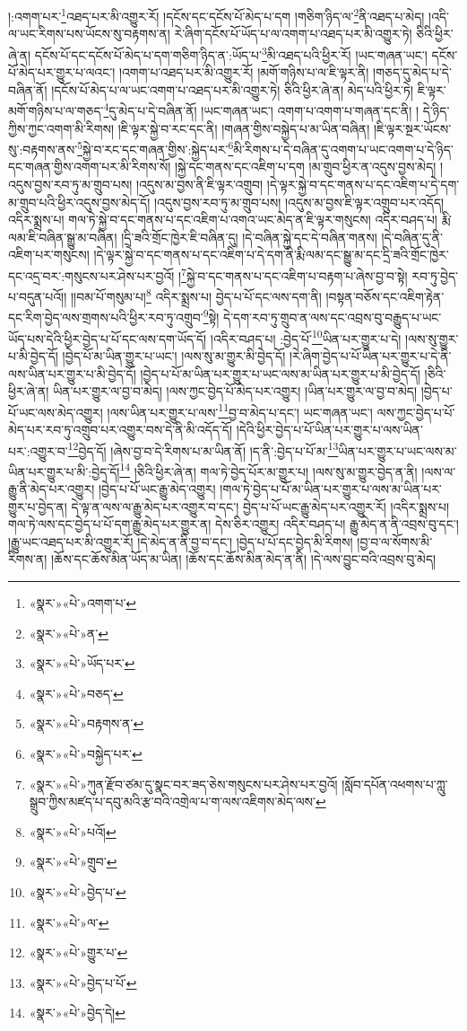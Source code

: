 །:འགག་པར་\footnote{«སྣར་»«པེ་»འགག་པ་}འཐད་པར་མི་འགྱུར་རོ། །དངོས་དང་དངོས་པོ་མེད་པ་དག །གཅིག་ཉིད་ལ་\footnote{«སྣར་»«པེ་»ན་}ནི་འཐད་པ་མེད། །འདི་ལ་ཡང་རིགས་པས་ཡོངས་སུ་བརྟགས་ན། རེ་ཞིག་དངོས་པོ་ཡོད་པ་ལ་འགག་པ་འཐད་པར་མི་འགྱུར་ཏེ། ཅིའི་ཕྱིར་ཞེ་ན། དངོས་པོ་དང་དངོས་པོ་མེད་པ་དག་གཅིག་ཉིད་ན་:ཡོད་པ་\footnote{«སྣར་»«པེ་»ཡོད་པར་}མི་འཐད་པའི་ཕྱིར་རོ། །ཡང་གཞན་ཡང་། དངོས་པོ་མེད་པར་གྱུར་པ་ལའང་། །འགག་པ་འཐད་པར་མི་འགྱུར་རོ། །མགོ་གཉིས་པ་ལ་ཇི་ལྟར་ནི། །གཅད་དུ་མེད་པ་དེ་བཞིན་ནོ། །དངོས་པོ་མེད་པ་ལ་ཡང་འགག་པ་འཐད་པར་མི་འགྱུར་ཏེ། ཅིའི་ཕྱིར་ཞེ་ན། མེད་པའི་ཕྱིར་ཏེ། ཇི་ལྟར་མགོ་གཉིས་པ་ལ་གཅད་\footnote{«སྣར་»«པེ་»བཅད་}དུ་མེད་པ་དེ་བཞིན་ནོ། །ཡང་གཞན་ཡང་། འགག་པ་འགག་པ་གཞན་དང་ནི། །
དེ་ཉིད་ཀྱིས་ཀྱང་འགག་མི་རིགས། །ཇི་ལྟར་སྐྱེ་བ་རང་དང་ནི། །གཞན་གྱིས་བསྐྱེད་པ་མ་ཡིན་བཞིན། །ཇི་ལྟར་སྔར་ཡོངས་སུ་:བརྟགས་ནས་\footnote{«སྣར་»«པེ་»བརྟགས་ན་}སྐྱེ་བ་རང་དང་གཞན་གྱིས་:སྐྱེད་པར་\footnote{«སྣར་»«པེ་»བསྐྱེད་པར་}མི་རིགས་པ་དེ་བཞིན་དུ་འགག་པ་ཡང་འགག་པ་དེ་ཉིད་དང་གཞན་གྱིས་འགག་པར་མི་རིགས་སོ། །སྐྱེ་དང་གནས་དང་འཇིག་པ་དག །མ་གྲུབ་ཕྱིར་ན་འདུས་བྱས་མེད། །འདུས་བྱས་རབ་ཏུ་མ་གྲུབ་པས། །འདུས་མ་བྱས་ནི་ཇི་ལྟར་འགྲུབ། །དེ་ལྟར་སྐྱེ་བ་དང་གནས་པ་དང་འཇིག་པ་དེ་དག་མ་གྲུབ་པའི་ཕྱིར་འདུས་བྱས་མེད་དོ། །འདུས་བྱས་རབ་ཏུ་མ་གྲུབ་པས། །འདུས་མ་བྱས་ཇི་ལྟར་འགྲུབ་པར་འདོད། འདིར་སྨྲས་པ། གལ་ཏེ་སྐྱེ་བ་དང་གནས་པ་དང་འཇིག་པ་འགའ་ཡང་མེད་ན་ཇི་ལྟར་གསུངས། འདིར་བཤད་པ། རྨི་ལམ་ཇི་བཞིན་སྒྱུ་མ་བཞིན། །དྲི་ཟའི་གྲོང་ཁྱེར་ཇི་བཞིན་དུ། །དེ་བཞིན་སྐྱེ་དང་དེ་བཞིན་གནས། །དེ་བཞིན་དུ་ནི་འཇིག་པར་གསུངས། །དེ་ལྟར་སྐྱེ་བ་དང་གནས་པ་དང་འཇིག་པ་དེ་དག་ནི་རྨི་ལམ་དང་སྒྱུ་མ་དང་དྲི་ཟའི་གྲོང་ཁྱེར་དང་འདྲ་བར་:གསུངས་པར་ཤེས་པར་བྱའོ། །\footnote{«སྣར་»«པེ་»ཀུན་རྫོབ་ཙམ་དུ་སྣང་བར་ཟད་ཅེས་གསུངས་པར་ཤེས་པར་བྱའོ། །སློབ་དཔོན་འཕགས་པ་ཀླུ་སྒྲུབ་ཀྱིས་མཛད་པ་དབུ་མའི་རྩ་བའི་འགྲེལ་པ་ག་ལས་འཇིགས་མེད་ལས་}སྐྱེ་བ་དང་གནས་པ་དང་འཇིག་པ་བརྟག་པ་ཞེས་བྱ་བ་སྟེ། རབ་ཏུ་བྱེད་པ་བདུན་པའོ།། །།བམ་པོ་གསུམ་པ།\footnote{«སྣར་»«པེ་»པའོ།} འདིར་སྨྲས་པ། བྱེད་པ་པོ་དང་ལས་དག་ནི། །བསྟན་བཅོས་དང་འཇིག་རྟེན་དང་རིག་བྱེད་ལས་གྲགས་པའི་ཕྱིར་རབ་ཏུ་འགྲུབ་\footnote{«སྣར་»«པེ་»གྲུབ་}སྟེ། དེ་དག་རབ་ཏུ་གྲུབ་ན་ལས་དང་འབྲས་བུ་བརྒྱུད་པ་ཡང་ཡོད་པས་དེའི་ཕྱིར་བྱེད་པ་པོ་དང་ལས་དག་ཡོད་དོ། །འདིར་བཤད་པ། :བྱེད་པོ་\footnote{«སྣར་»«པེ་»བྱེད་པ་}ཡིན་པར་གྱུར་པ་དེ། །ལས་སུ་གྱུར་པ་མི་བྱེད་དོ། །བྱེད་པོ་མ་ཡིན་གྱུར་པ་ཡང་། །ལས་སུ་མ་གྱུར་མི་བྱེད་དོ། །རེ་ཞིག་བྱེད་པ་པོ་ཡིན་པར་གྱུར་པ་དེ་ནི་ལས་ཡིན་པར་གྱུར་པ་མི་བྱེད་དོ། །བྱེད་པ་པོ་མ་ཡིན་པར་གྱུར་པ་ཡང་ལས་མ་ཡིན་པར་གྱུར་པ་མི་བྱེད་དོ། །ཅིའི་ཕྱིར་ཞེ་ན། ཡིན་པར་གྱུར་ལ་བྱ་བ་མེད། །ལས་ཀྱང་བྱེད་པོ་མེད་པར་འགྱུར། །ཡིན་པར་གྱུར་ལ་བྱ་བ་མེད། །བྱེད་པ་པོ་ཡང་ལས་མེད་འགྱུར། །ལས་ཡིན་པར་གྱུར་པ་ལས་\footnote{«སྣར་»«པེ་»ལ་}བྱ་བ་མེད་པ་དང་། ཡང་གཞན་ཡང་། ལས་ཀྱང་བྱེད་པ་པོ་མེད་པར་རབ་ཏུ་འགྲུབ་པར་འགྱུར་བས་དེ་ནི་མི་འདོད་དོ། །དེའི་ཕྱིར་བྱེད་པ་པོ་ཡིན་པར་གྱུར་པ་ལས་ཡིན་པར་:འགྱུར་བ་\footnote{«སྣར་»«པེ་»གྱུར་པ་}བྱེད་དོ། །ཞེས་བྱ་བ་དེ་རིགས་པ་མ་ཡིན་ནོ། །ད་ནི་:བྱེད་པ་པོ་མ་\footnote{«སྣར་»«པེ་»བྱེད་པ་པོ་}ཡིན་པར་གྱུར་པ་ཡང་ལས་མ་ཡིན་པར་གྱུར་པ་མི་:བྱེད་དོ།\footnote{«སྣར་»«པེ་»བྱེད་དེ།} །ཅིའི་ཕྱིར་ཞེ་ན། གལ་ཏེ་བྱེད་པོར་མ་གྱུར་པ། །ལས་སུ་མ་གྱུར་བྱེད་ན་ནི། །ལས་ལ་རྒྱུ་ནི་མེད་པར་འགྱུར། །བྱེད་པ་པོ་ཡང་རྒྱུ་མེད་འགྱུར། །གལ་ཏེ་བྱེད་པ་པོ་མ་ཡིན་པར་གྱུར་པ་ལས་མ་ཡིན་པར་གྱུར་པ་བྱེད་ན། དེ་ལྟ་ན་ལས་ལ་རྒྱུ་མེད་པར་འགྱུར་བ་དང་། བྱེད་པ་པོ་ཡང་རྒྱུ་མེད་པར་འགྱུར་རོ། །འདིར་སྨྲས་པ། གལ་ཏེ་ལས་དང་བྱེད་པ་པོ་དག་རྒྱུ་མེད་པར་གྱུར་ན། དེས་ཅིར་འགྱུར། འདིར་བཤད་པ། རྒྱུ་མེད་ན་ནི་འབྲས་བུ་དང་། །རྒྱུ་ཡང་འཐད་པར་མི་འགྱུར་རོ། །དེ་མེད་ན་ནི་བྱ་བ་དང་། །བྱེད་པ་པོ་དང་བྱེད་མི་རིགས། །བྱ་བ་ལ་སོགས་མི་རིགས་ན། །ཆོས་དང་ཆོས་མིན་ཡོད་མ་ཡིན། །ཆོས་དང་ཆོས་མིན་མེད་ན་ནི། །དེ་ལས་བྱུང་བའི་འབྲས་བུ་མེད། 